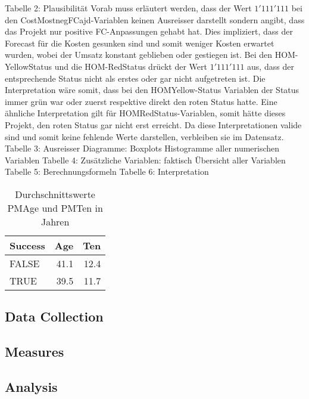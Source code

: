 Tabelle 2: Plausibilität
Vorab muss erläutert werden, dass der Wert $1'111'111$ bei den CostMostnegFCajd-Variablen keinen Ausreisser darstellt sondern angibt, dass das Projekt nur positive FC-Anpassungen gehabt hat. Dies impliziert, dass der Forecast für die Kosten gesunken sind und somit weniger Kosten erwartet wurden, wobei der Umsatz konstant geblieben oder gestiegen ist. Bei den HOM-YellowStatus und die HOM-RedStatus drückt der Wert $1'111'111$ aus, dass der entsprechende Status nicht als erstes oder gar nicht aufgetreten ist. Die Interpretation wäre somit, dass bei den HOMYellow-Status Variablen der Status immer grün war oder zuerst respektive direkt den roten Status hatte. Eine ähnliche Interpretation gilt für HOMRedStatus-Variablen, somit hätte dieses Projekt, den roten Status gar nicht erst erreicht. Da diese Interpretationen valide sind und somit keine fehlende Werte darstellen, verbleiben sie im Datensatz. 
Tabelle 3: Ausreisser
Diagramme: Boxplots Histogramme aller numerischen Variablen
Tabelle 4: Zusätzliche Variablen: faktisch Übersicht aller Variablen 
Tabelle 5: Berechnungsformeln
Tabelle 6: Interpretation
\begin{table}[H]
	\centering
	\caption{Durchschnittswerte PMAge und PMTen in Jahren}
	\begin{tabular}{lrr}
		\textbf{Success} & \multicolumn{1}{l}{\textbf{Age}} & \multicolumn{1}{l}{\textbf{Ten}} \\\hline
		FALSE & 41.1 & 12.4 \\
		TRUE  & 39.5 & 11.7 \\
	\end{tabular}%
	\label{ageten}%
\end{table}%
\subsection*{Data Collection}
\subsection*{Measures}
\subsection*{Analysis}
